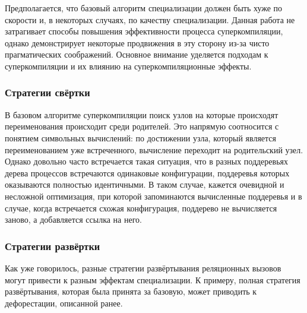 Предполагается, что базовый алгоритм специализации должен быть хуже по
скорости и, в некоторых случаях, по качеству специализации.
Данная работа не затрагивает способы повышения эффективности процесса
суперкомпиляции, однако демонстрирует некоторые продвижения в эту сторону
из-за чисто прагматических соображений. Основное внимание уделяется
подходам к суперкомпиляции и их влиянию на суперкомпиляционные эффекты.

\subsubsection{Стратегии свёртки}

В базовом алгоритме суперкомпиляции поиск узлов на которые происходят переименования
происходит среди родителей. Это напрямую соотносится с понятием символьных
вычислений: по достижении узла, который является переименованием уже встреченного,
вычисление переходит на родительский узел. Однако довольно часто встречается
такая ситуация,
что в разных поддеревьях дерева процессов встречаются одинаковые конфигурации,
поддеревья которых оказываются полностью идентичными. В таком случае, кажется
очевидной и несложной оптимизация, при которой запоминаются вычисленные
поддеревья и в случае, когда встречается схожая конфигурация,
поддерево не вычисляется заново, а добавляется ссылка на него.



\subsubsection{Стратегии развёртки}

Как уже говорилось, разные стратегии развёртывания реляционных вызовов могут
привести к разным эффектам специализации. К примеру, полная стратегия развёртывания,
которая была принята за базовую, может приводить к дефорестации, описанной ранее.

